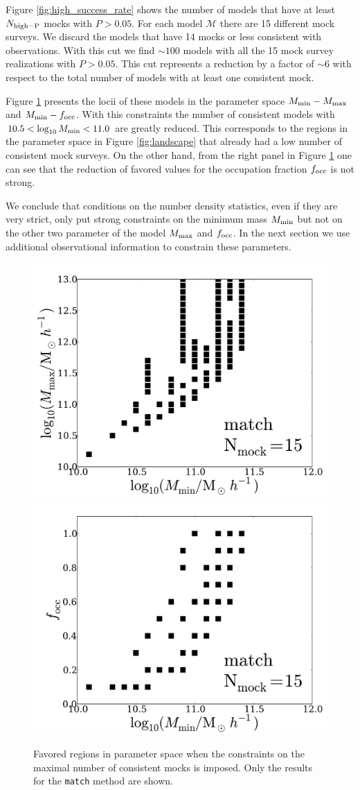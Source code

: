 \documentclass[usenatbib]{mn2e}
\begin{document}
Figure \ref{fig:high_success_rate} shows the number of models
that have at least $N_{\rm high-P}$ mocks with $P>0.05$. For each
model ${\mathcal M}$ there are 15 different mock surveys.  We discard
the models that have 14 mocks or less consistent with
observations. With this cut we find $\sim 100$ models with all the 15
mock survey realizations with $P>0.05$.  This cut represents a
reduction by a factor of $\sim 6$ with respect to the total number of
models with at least one consistent mock.   

Figure \ref{fig:restriction_mock} presents the locii of these models
in the parameter space $M_{\rm min}-M_{\rm max}$ and $M_{\rm
  min}-f_{\rm occ}$. With this constraints the
number of consistent models with  $10.5 < \log_{10}M_{\rm min}< 11.0$ are
greatly reduced. This corresponds to the regions in the parameter
space in Figure \ref{fig:landscape} that already had a low number of
consistent mock surveys. On the other hand, from the right panel in
Figure \ref{fig:restriction_mock} one can see that the reduction of
favored values for the occupation fraction $f_{\rm occ}$ is not strong. 

We conclude that conditions on the number density statistics, even if they are
very strict, only put strong constraints on the minimum mass $M_{\rm
  min}$ but not on the other two parameter of the model $M_{\rm max}$
and $f_{\rm occ}$. In the next section we use additional observational
information to constrain these parameters.

\begin{figure}
\begin{center}
\includegraphics[width=0.46\linewidth,angle=0]{Fig5_match_mass_mock.pdf} 
\hspace{5mm}
\includegraphics[width=0.46\linewidth,angle=0]{Fig5_match_f_occ_mock.pdf}
\end{center}  
\caption{Favored regions in parameter space when the constraints on
  the maximal number of consistent mocks is imposed. Only the results
  for the {\texttt{match}} method are shown.
  \label{fig:restriction_mock}}  
\end{figure}
\end{document}

